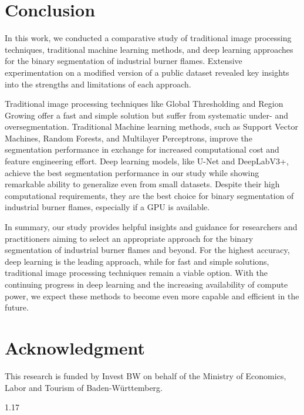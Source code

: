 \documentclass{isprs} %
\begin{document}
\section{Conclusion}
In this work, we conducted a comparative study of traditional image processing techniques, traditional machine learning methods, and deep learning approaches for the binary segmentation of industrial burner flames. Extensive experimentation on a modified version of a public dataset \citep{grosskopf2021evaluation} revealed key insights into the strengths and limitations of each approach. 

Traditional image processing techniques like Global Thresholding and Region Growing offer a fast and simple solution but suffer from systematic under- and oversegmentation. Traditional Machine learning methods, such as Support Vector Machines, Random Forests, and Multilayer Perceptrons, improve the segmentation performance in exchange for increased computational cost and feature engineering effort. Deep learning models, like U-Net and DeepLabV3+, achieve the best segmentation performance in our study while showing remarkable ability to generalize even from small datasets. Despite their high computational requirements, they are the best choice for binary segmentation of industrial burner flames, especially if a GPU is available.

In summary, our study provides helpful insights and guidance for researchers and practitioners aiming to select an appropriate approach for the binary segmentation of industrial burner flames and beyond. For the highest accuracy, deep learning is the leading approach, while for fast and simple solutions, traditional image processing techniques remain a viable option. With the continuing progress in deep learning and the increasing availability of compute power, we expect these methods to become even more capable and efficient in the future.

\section*{Acknowledgment}
This research is funded by Invest BW on behalf of the Ministry of Economics, Labor and Tourism of Baden-Württemberg.

{
	\begin{spacing}{1.17}
		\normalsize
	\end{spacing}
}
\end{document}
